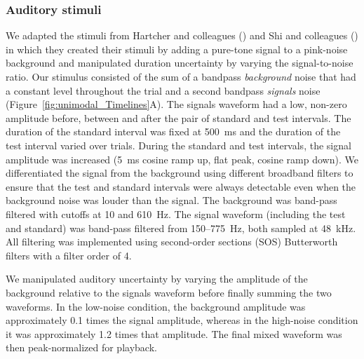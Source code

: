 \documentclass{jov}
\providecommand{\citeyearpar}[1]{(\citeyear{#1})}
\begin{document}

\subsubsection{Auditory stimuli}

We adapted the stimuli from Hartcher and colleagues \citeyearpar{hartcher2014duration} and Shi and colleagues \citeyearpar{shi2013reducing} in which they created their stimuli by adding a pure-tone signal to a pink-noise background and manipulated duration uncertainty by varying the signal-to-noise ratio. Our stimulus consisted of the sum of a bandpass {\em background} noise that had a constant level throughout the trial and a second bandpass {\em signals} noise (Figure~\ref{fig:unimodal_Timelines}A). The signals waveform had a low, non-zero amplitude before, between and after the pair of standard and test intervals. The duration of the standard interval was fixed at 500~ms and the duration of the test interval varied over trials. During the standard and test intervals, the signal amplitude was increased (5~ms cosine ramp up, flat peak, cosine ramp down). We differentiated the signal from the background using different broadband filters to ensure that the test and standard intervals were always detectable even when the background noise was louder than the signal. The background was band-pass filtered with cutoffs at 10 and 610~Hz. The signal waveform (including the test and standard) was band-pass filtered from 150--775~Hz, both sampled at 48~kHz. All filtering was implemented using second-order sections (SOS) Butterworth filters with a filter order of 4.

We manipulated auditory uncertainty by varying the amplitude of the background relative to the signals waveform before finally summing the two waveforms. In the low-noise condition, the background amplitude was approximately 0.1 times the signal amplitude, whereas in the high-noise condition it was approximately 1.2 times that amplitude. The final mixed waveform was then peak-normalized for playback.
\end{document}
